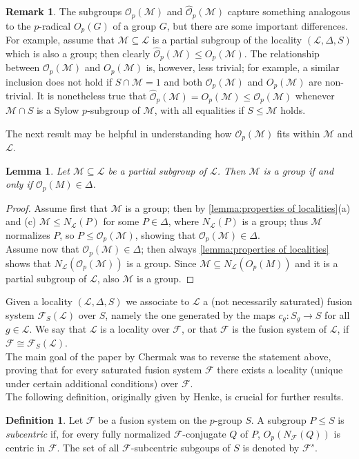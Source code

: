 \documentclass{amsart}
\numberwithin{equation}{section}
\newtheorem{lemma}[equation]{Lemma}
\theoremstyle{definition}
\newtheorem{definition}[equation]{Definition}
\newtheorem{remark}[equation]{Remark}
\theoremstyle{subresult}
\theoremstyle{caseresult}
\newcommand{\F}{\mathcal{F}}
\newcommand{\M}{\mathcal{M}}
\renewcommand{\L}{\mathcal{L}}
\newcommand{\coll}{\mathcal{O}}
\newcommand{\fto}{\longrightarrow}
\newcommand{\<}{\langle}
\renewcommand{\>}{\rangle}
\begin{document}
\begin{remark}
	The subgroups $\coll_p(\M)$ and $\hat{\coll}_p(\M)$ capture something analogous to the $p$-radical $O_p(G)$ of a group $G$, but there are some important differences.\\
	For example, assume that $\M \subseteq \L$ is a partial subgroup of the locality $(\L,\Delta,S)$ which is also a group; then clearly $\hat{\coll}_p(\M) \le  O_p(\M)$. The relationship between $\coll_p(\M)$ and $O_p(\M)$ is, however, less trivial; for example, a similar inclusion does not hold if $S \cap \M = 1$ and both $\coll_p(\M)$ and $O_p(\M)$ are non-trivial. It is nonetheless true that $\hat{\coll}_p(\M) = O_p(\M) \le \coll_p(\M)$ whenever $\M \cap S$ is a Sylow $p$-subgroup of $\M$, with all equalities if $S \le \M$ holds.
\end{remark}
The next result may be helpful in understanding how $\coll_p(\M)$ fits within $\M$ and $\L$.

\begin{lemma}
	Let $\M \subseteq \L$ be a partial subgroup of $\L$. Then $\M$ is a group if and only if $\coll_p(M) \in \Delta$.
\end{lemma}
\begin{proof}
	Assume first that $\M$ is a group; then by \ref{lemma:properties of localities}(a) and (c) $\M \le N_\L(P)$ for some $P \in \Delta$, where $N_\L(P)$ is a group; thus $\M$ normalizes $P$, so $P \le \coll_p(\M)$, showing that $\coll_p(\M) \in \Delta$.\\
	Assume now that $\coll_p(\M) \in \Delta$; then always \ref{lemma:properties of localities} shows that $N_\L(\coll_p(\M))$ is a group. Since $\M \subseteq N_\L(O_p(M))$ and it is a partial subgroup of $\L$, also $\M$ is a group.
\end{proof}

\vspace{0.6cm}
Given a locality $(\L,\Delta,S)$ we associate to $\L$ a (not necessarily saturated) fusion system $\F_S(\L)$ over $S$, namely the one generated by the maps $c_g: S_g \fto S$ for all $g \in \L$. We say that $\L$ is a locality over $\F$, or that $\F$ is the fusion system of $\L$, if $\F \cong \F_S(\L)$.\\
The main goal of the paper \cite{Chermak:2013} by Chermak was to reverse the statement above, proving that for every saturated fusion system $\F$ there exists a locality (unique under certain additional conditions) over $\F$.\\

The following definition, originally given by Henke, is crucial for further results.
\begin{definition}\label{def:subcentric}
Let $\F$ be a fusion system on the $p$-group $S$. A subgroup $P \le S$ is \emph{subcentric} if, for every fully normalized $\F$-conjugate $Q$ of $P$, $O_p(N_\F(Q))$ is centric in $\F$. The set of all $\F$-subcentric subgoups of $S$ is denoted by $\F^s$.
\end{definition}
\end{document}
